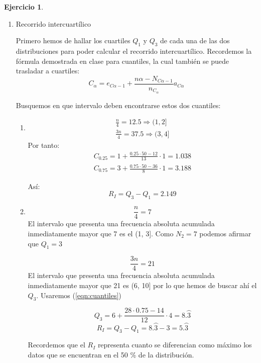 \documentclass[a4paper, 12pt]{article}
\theoremstyle{definition}
\newtheorem{ej}{Ejercicio}
\begin{document}
\begin{ej}
\begin{enumerate}[label=\textit{\alph*)}]
\begin{enumerate}[label=\arabic*)]
    \item Recorrido intercuartílico
    
    Primero hemos de hallar los cuartiles \(Q_1\) y \(Q_3\) de cada una de las dos distribuciones para poder calcular el recorrido intercuartílico. Recordemos la fórmula demostrada en clase para cuantiles, la cual también se puede trasladar a cuartiles:
    \begin{equation}\label{eqn:cuantiles}
        C_\alpha = e_{C\alpha - 1} + \frac{n\alpha - N_{C\alpha - 1}}{n_{C_\alpha}}a_{C\alpha}
    \end{equation}
    
    Busquemos en que intervalo deben encontrarse estos dos cuantiles:
    \begin{enumerate}[label=(\arabic*)]
        \item 

    \begin{align*}
    \frac{n}{4} = 12.5 \Rightarrow (1,2] \\
    \frac{3n}{4} = 37.5 \Rightarrow (3,4]
    \end{align*}
    Por tanto:
    \begin{align*}
        C_{0.25} = 1 + \frac{0.25 \cdot 50 - 12}{13} \cdot 1 = 1.038 \\
        C_{0.75} = 3 + \frac{0.75 \cdot 50 - 36}{8} \cdot 1 = 3.188
    \end{align*}
    
    Así:
    \[
    R_I = Q_3 - Q_1 = 2.149
    \]
    
    \item
    
    \[
    \frac{n}{4} = 7
    \]
    El intervalo que presenta una frecuencia absoluta acumulada inmediatamente mayor que 7 es el (1, 3]. Como \(N_2 = 7\) podemos afirmar que \(Q_1 = 3\)
    
    \[
    \frac{3n}{4} = 21
    \]
    El intervalo que presenta una frecuencia absoluta acumulada inmediatamente mayor que 21 es (6, 10] por lo que hemos de buscar ahí el \(Q_3\). Usaremos (\ref{eqn:cuantiles})
    
    \[
    Q_3 = 6 + \frac{28 \cdot 0.75 - 14}{12} \cdot 4 = 8.\wideparen{3}
    \]
    \[
    R_I = Q_3 - Q_1 = 8.\wideparen{3} - 3 = 5.\wideparen{3}
    \]
    
    Recordemos que el \(R_I\) representa cuanto se diferencian como máximo los datos que se encuentran en el 50 \% de la distribución.
    \end{enumerate}
    

\end{enumerate}
\end{enumerate}
\end{ej}
\end{document}
